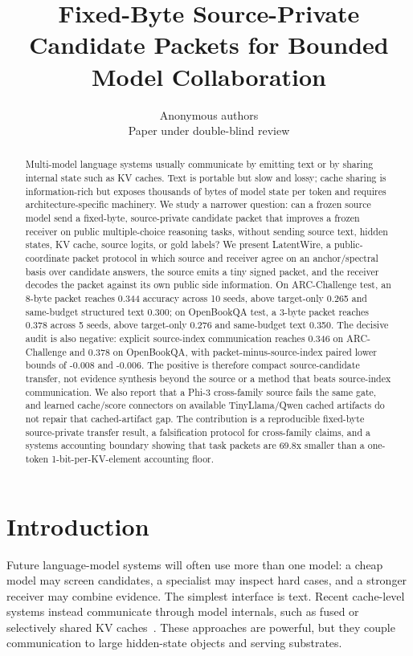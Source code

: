 \documentclass{article}
\title{Fixed-Byte Source-Private Candidate Packets for Bounded Model Collaboration}
\author{Anonymous authors\\Paper under double-blind review}
\newcommand{\method}{LatentWire}
\newcommand{\arc}{ARC-Challenge}
\newcommand{\obqa}{OpenBookQA}
\begin{document}
\ifcolmsubmission
\linenumbers
\fi

\maketitle

\begin{abstract}
Multi-model language systems usually communicate by emitting text or by sharing internal state such as KV caches. Text is portable but slow and lossy; cache sharing is information-rich but exposes thousands of bytes of model state per token and requires architecture-specific machinery. We study a narrower question: can a frozen source model send a fixed-byte, source-private candidate packet that improves a frozen receiver on public multiple-choice reasoning tasks, without sending source text, hidden states, KV cache, source logits, or gold labels? We present \method, a public-coordinate packet protocol in which source and receiver agree on an anchor/spectral basis over candidate answers, the source emits a tiny signed packet, and the receiver decodes the packet against its own public side information. On \arc{} test, an 8-byte packet reaches 0.344 accuracy across 10 seeds, above target-only 0.265 and same-budget structured text 0.300; on \obqa{} test, a 3-byte packet reaches 0.378 across 5 seeds, above target-only 0.276 and same-budget text 0.350. The decisive audit is also negative: explicit source-index communication reaches 0.346 on \arc{} and 0.378 on \obqa{}, with packet-minus-source-index paired lower bounds of -0.008 and -0.006. The positive is therefore compact source-candidate transfer, not evidence synthesis beyond the source or a method that beats source-index communication. We also report that a Phi-3 cross-family source fails the same gate, and learned cache/score connectors on available TinyLlama/Qwen cached artifacts do not repair that cached-artifact gap. The contribution is a reproducible fixed-byte source-private transfer result, a falsification protocol for cross-family claims, and a systems accounting boundary showing that task packets are 69.8x smaller than a one-token 1-bit-per-KV-element accounting floor.
\end{abstract}

\section{Introduction}

Future language-model systems will often use more than one model: a cheap model may screen candidates, a specialist may inspect hard cases, and a stronger receiver may combine evidence. The simplest interface is text. Recent cache-level systems instead communicate through model internals, such as fused or selectively shared KV caches~\citep{Fu2025C2C,Shi2025KVComm}. These approaches are powerful, but they couple communication to large hidden-state objects and serving substrates.
\end{document}
